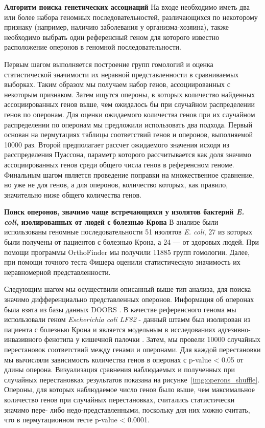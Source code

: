\textbf{Алгоритм поиска генетических ассоциаций}
На входе необходимо иметь два или более набора геномных последовательностей, различающихся по некоторому признаку (например, наличию заболевания у организма-хозяина), также необходимо выбрать один референсный геном для которого известно расположение оперонов в геномной последовательности.

Первым шагом выполняется построение групп гомологий и оценка статистической значимости их неравной представленности в сравниваемых выборках. Таким образом мы получаем набор генов, ассоциированных с некоторым признаком. Затем ищутся опероны, в которых количество найденных ассоциированных генов выше, чем ожидалось бы при случайном распределении генов по оперонам. Для оценки ожидаемого количества генов при их случайном распределении по оперонам мы предложили использовать два подхода. Первый основан на пермутациях таблицы соответствий генов и оперонов, выполняемой 10000 раз. Второй предполагает рассчет ожидаемого значения исходя из расспределения Пуассона, параметр которого рассчитывается как доля значимо ассоциированных генов среди общего числа генов в референсном геноме. Финальным шагом является проведение поправки на множественное сравнение, но уже не для генов, а для оперонов, количество которых, как правило, значительно ниже общего количества генов. 

\textbf{Поиск оперонов, значимо чаще встречающихся у изолятов бактерий \textit{E. coli}, изолированных от людей с болезнью Крона}
В анализе были использованы геномные последовательности 51 изолятов \textit{E. coli}, 27 из которых были получены от пациентов с болезнью Крона, а 24 --- от здоровых людей. При помощи программы OrthoFinder мы получили 11885 групп гомологии. Далее, при помощи точного теста Фишера оценили статистическую значимость их неравномерной представленности.  

Следующим шагом мы осуществили описанный выше тип анализа, для поиска значимо дифференциально представленных оперонов. Информация об оперонах была взята из базы данных DOORS \cite{mao2014door}. В качестве референсного генома мы использовали геном \textit{Escherichia coli LF82} - данный штамм был изолирован из пациента с болезнью Крона и является модельным в исследованиях адгезивно-инвазивного фенотипа у кишечной палочки \cite{miquel2010complete}. Затем, мы провели 10000 случайных перестановок соответствий между генами и оперонами. Для каждой перестановки мы вычисляли зависимость количества генов в оперонах с p-value < 0.05 от длины оперона. Визуализация сравнения наблюдаемых и полученных при случайных перестановках результатов показана на рисунке~\ref{img:operons_shuffle}. Опероны, для которых наблюдаемое число генов было выше, чем максимальное количество генов при случайных перестановках, считались статистически значимо пере- либо недо-представленными, поскольку для них можно считать, что в пермутационном тесте p-value < 0.0001. 

